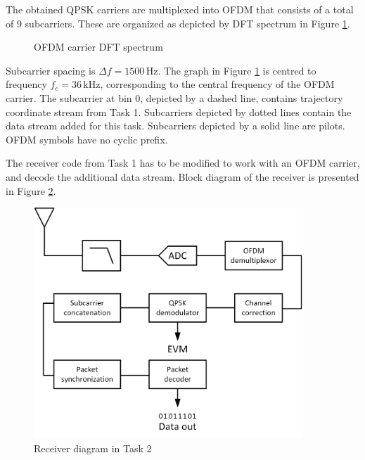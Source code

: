 \documentclass[openany]{book}
\begin{document}
	The obtained QPSK carriers are multiplexed into OFDM that consists of a 
	total of 9 subcarriers. These are organized as depicted by DFT spectrum in 
	Figure \ref{fig:dft}.
	\begin{figure}[h!]
		\centering
		\caption{OFDM carrier DFT spectrum}
		\label{fig:dft}
	\end{figure}
	
	Subcarrier spacing is $\varDelta f = 1500 \,\textrm{Hz}$. The graph in 
	Figure \ref{fig:dft} is centred to frequency $f_c = 36 \,\textrm{kHz}$, 
	corresponding to the central frequency of the OFDM carrier. The subcarrier 
	at bin 0, depicted by a dashed line, contains trajectory coordinate stream 
	from Task 1. Subcarriers depicted by dotted lines contain the data stream 
	added for this task. Subcarriers depicted by a solid line are pilots. OFDM 
	symbols have no cyclic prefix.
	
	The receiver code from Task 1 has to be modified to work with an OFDM 
	carrier, and decode the additional data stream. Block diagram of the 
	receiver is presented in Figure \ref{fig:task2}.
	
	\begin{figure}[h!]
		\centering
		\includegraphics[width=0.9\textwidth]{Images/Task2.png}
		\caption{Receiver diagram in Task 2}
		\label{fig:task2}
	\end{figure}
	
\end{document}
